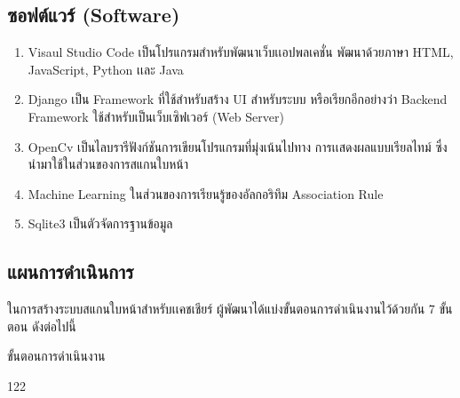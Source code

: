 \subsection{ซอฟต์แวร์ (Software)}
\begin{enumerate}
	\item Visaul Studio Code เป็นโปรแกรมสำหรับพัฒนาเว็บเเอปพลเคชั่น พัฒนาด้วยภาษา HTML, JavaScript, Python เเละ Java 
	\item Django เป็น Framework ที่ใช้สำหรับสร้าง UI สำหรับระบบ หรือเรียกอีกอย่างว่า Backend Framework ใช้สำหรับเป็นเว็บเซิฟเวอร์ (Web Server)  
	\item OpenCv เป็นไลบรารีฟังก์ชันการเขียนโปรแกรมที่มุ่งเน้นไปทาง การเเสดงผลแบบเรียลไทม์
	ซึ่งนำมาใช้ในส่วนของการสแกนใบหน้า
	\item Machine Learning ในส่วนของการเรียนรู้ของอัลกอริทึม Association Rule	
	\item Sqlite3 เป็นตัวจัดการฐานข้อมูล

\end{enumerate}

\newpage
\subsection{แผนการดำเนินการ}
	ในการสร้างระบบสแกนใบหน้าสำหรับเเคชเชียร์ ผู้พัฒนาได้แบ่งขั้นตอนการดำเนินงานไว้ด้วยกัน 7 ขั้นตอน ดังต่อไปนี้

\begin{table}[H]
	\noindent
	\caption{ขั้นตอนการดำเนินงาน}
	\begin{ganttchart}[
		canvas/.append style={fill=none, draw=black!5, line width=.75pt},
		vgrid={*2{draw=black!7, line width=.75pt}},
		title label font=\bfseries\footnotesize,
		bar label node/.append style={
			align=left,
			text width=width("7. Functional Testing On")},
		bar/.append style={draw=none, fill=black!63}
		]{1}{22}
		\\
		 \\
		 \\
		 \\
		 \\
		 \\
		 \\
		 \\
		 \\
		 \\
	\end{ganttchart}
	\label{tab:ganttchart}
\end{table}
